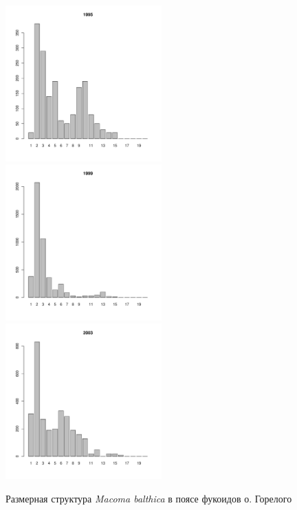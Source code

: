 \begin{figure}[h]
\begin{multicols}{3}
\hfill
\includegraphics[width=60mm]{../White_Sea/Luvenga_Goreliy/midlow_1995_.pdf}
\hfill
\includegraphics[width=60mm]{../White_Sea/Luvenga_Goreliy/midlow_1999_.pdf}
\hfill
\includegraphics[width=60mm]{../White_Sea/Luvenga_Goreliy/midlow_2003_.pdf}
\end{multicols}


\caption{Размерная структура {\it Macoma balthica} в поясе фукоидов о. Горелого}
\label{ris:size_str_Goreliy_midlow}
\end{figure}


